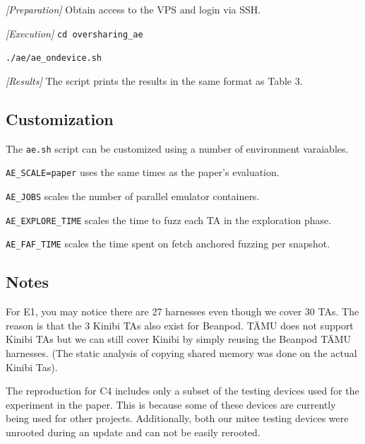 \documentclass[conference]{IEEEtran}
\begin{document}

\textit{[Preparation]}
Obtain access to the VPS and login via SSH.

\textit{[Execution]}
\small
\texttt{cd oversharing\_ae}

\texttt{./ae/ae\_ondevice.sh}
\normalsize

\textit{[Results]}
The script prints the results in the same format as Table 3.

\subsection{Customization}
The \texttt{ae.sh} script can be customized using a number of environment varaiables. 

\texttt{AE\_SCALE=paper} uses the same times as the paper's evaluation.

\texttt{AE\_JOBS} scales the number of parallel emulator containers.

\texttt{AE\_EXPLORE\_TIME} scales the time to fuzz each TA in the exploration phase.

\texttt{AE\_FAF\_TIME} scales the time spent on fetch anchored fuzzing per snapshot.


\subsection{Notes}

For E1, you may notice there are 27 harnesses even though we cover 30 TAs. The reason is that the 3 Kinibi TAs also exist for Beanpod. 
TÄMU does not support Kinibi TAs but we can still cover Kinibi by simply reusing the Beanpod TÄMU harnesses. (The static analysis of 
copying shared memory was done on the actual Kinibi Tas).

The reproduction for C4 includes only a subset of the testing devices used for the experiment in the paper. 
This is because some of these devices are currently being used for other projects. Additionally, both our mitee testing devices were unrooted during 
an update and can not be easily rerooted.

\end{document}
